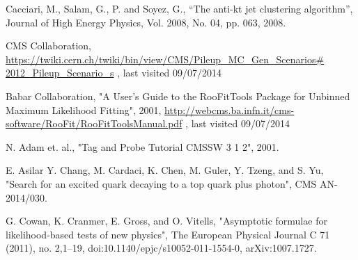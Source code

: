 \documentclass[12pt,oneandhalf,chaparabic,phys,ms,eng]{metu}
\begin{document}
\begin{thebibliography}{99}
 Cacciari, M., Salam, G., P. and Soyez, G., “The anti-kt jet clustering algorithm”, Journal of High Energy Physics, Vol. 2008, No. 04, pp. 063, 2008.

	CMS Collaboration, \url{https://twiki.cern.ch/twiki/bin/view/CMS/Pileup_MC_Gen_Scenarios# 2012_Pileup_Scenario_s} , last visited 09/07/2014

	Babar Collaboration, "A User’s Guide to the RooFitTools Package for Unbinned Maximum Likelihood Fitting", 2001, \url{http://webcms.ba.infn.it/cms-software/RooFit/RooFitToolsManual.pdf} , last visited 09/07/2014


	N. Adam et. al., "Tag and Probe Tutorial CMSSW 3 1 2", 2001.

	E. Asilar Y. Chang, M. Cardaci, K. Chen, M. Guler, Y. Tzeng, and S. Yu, "Search for an excited quark decaying to a top quark plus photon", CMS AN-2014/030.


	G. Cowan, K. Cranmer, E. Gross, and O. Vitells, "Asymptotic formulae for likelihood-based tests of new physics", The European Physical Journal C 71 (2011), no. 2,1–19, doi:10.1140/epjc/s10052-011-1554-0, arXiv:1007.1727.




\end{thebibliography}


%
\end{document}
